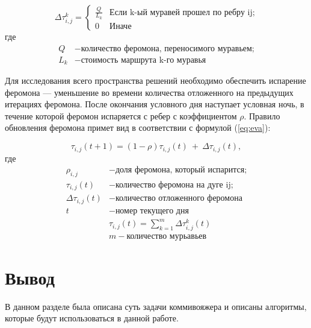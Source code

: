 \begin{equation}\label{eq:update} 
	{\displaystyle \Delta \tau _{i,j}^k={\begin{cases}\frac{Q}{L_{k}}& {\mbox{Если k-ый муравей прошел по ребру ij;}}\\0&{\mbox{Иначе}}\end{cases}}}
\end{equation}
\noindent где
\begin{align*}
	Q &- \text{количество феромона, переносимого муравьем;} \\
	L_{k} &- \text{стоимость маршрута k-го муравья}
\end{align*}

Для  исследования  всего  пространства  решений необходимо обеспечить испарение феромона ---  уменьшение  во  времени  количества  отложенного  на  предыдущих  итерациях  феромона. После окончания условного дня наступает условная ночь, в течение которой феромон испаряется с ребер с коэффициентом $\rho$. Правило обновления феромона примет вид в соответствии с формулой (\ref{eq:eva}):

\begin{equation}\label{eq:eva} 
	\tau _{i,j}(t+1)=(1-\rho )\tau _{i,j}(t)\ +\ \Delta \tau _{i,j}(t),
\end{equation}
\noindent где
\begin{align*}
	\rho _{i,j} &- \text{доля феромона, который испарится;} \\
	\tau _{i,j}(t) &- \text{количество феромона на дуге ij;} \\
	\Delta \tau _{i,j}(t) &- \text{количество отложенного феромона} \\ 
	t &- \text{номер текущего дня} \\
	& \tau _{i,j}(t) = \sum\limits_{k=1}^m \Delta \tau _{i,j}^k(t)	\\
	& m - \text{количество мурьавьев}
\end{align*}

\section{Вывод}
В данном разделе была описана суть задачи коммивояжера и описаны алгоритмы, которые будут использоваться в данной работе.